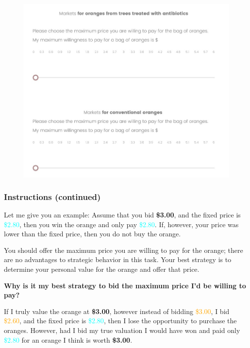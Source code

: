 \documentclass[12pt]{article}
\begin{document}
\begin{figure}[H]
    \centering
    \includegraphics[width=0.8\linewidth]{BDM_market.jpg}

\end{figure}

\clearpage


\subsubsection*{Instructions (continued)}
Let me give you an example: Assume that you bid \textbf{\$3.00}, and the fixed price is \textcolor{cyan}{\$2.80}, then you win the orange and only pay \textcolor{cyan}{\$2.80}. If, however, your price was lower than the fixed price, then you do not buy the orange.  

You should offer the maximum price you are willing to pay for the orange; there are no advantages to strategic behavior in this task. Your best strategy is to determine your personal value for the orange and offer that price.  

\vspace{0.3cm}

\textbf{Why is it my best strategy to bid the maximum price I’d be willing to pay?}  

If I truly value the orange at \textbf{\$3.00}, however instead of bidding \textcolor{orange}{\$3.00}, I bid \textcolor{orange}{\$2.60}, and the fixed price is \textcolor{cyan}{\$2.80}, then I lose the opportunity to purchase the oranges. However, had I bid my true valuation I would have won and paid only \textcolor{cyan}{\$2.80} for an orange I think is worth \textbf{\$3.00}.  
\end{document}
